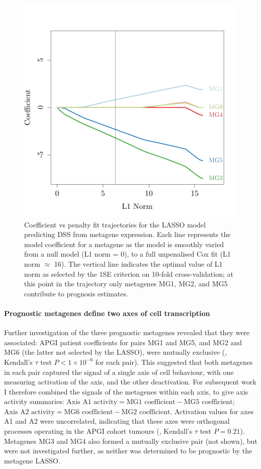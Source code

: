 \documentclass[dissertation.tex]{subfiles}
\begin{document}
\begin{figure}[!htbp]
\centering
\includegraphics[width=.7\linewidth]{analysis/biosurv/reports/18_SIS_diag_dsd_final/figure/nmf-metagene-glmnet-plots-2}
\caption[Fit trajectory of the \texorpdfstring{\acrshort{LASSO}}{LASSO} predicting \texorpdfstring{\acrshort{DSS}}{DSS} from metagene coefficients]{Coefficient vs penalty fit trajectories for the \acrshort{LASSO} model predicting \gls{DSS} from metagene expression.  Each line represents the model coefficient for a metagene as the model is smoothly varied from a null model (L1 norm = 0), to a full unpenalised Cox fit (L1 norm $\approx$ 16).  The vertical line indicates the optimal value of L1 norm as selected by the 1SE criterion on 10-fold cross-validation; at this point in the trajectory only metagenes MG1, MG2, and MG5 contribute to prognosis estimates.}\label{fig:sigs-resub-lasso-track}
\end{figure}

\paragraph{Prognostic metagenes define two axes of cell transcription}
Further investigation of the three prognostic metagenes revealed that they were associated: \gls{APGI} patient coefficients for pairs MG1 and MG5, and MG2 and MG6 (the latter not selected by the \gls{LASSO}), were mutually exclusive (, Kendall's $\tau$ test $P < 1 \times 10^{-6}$ for each pair).  This suggested that both metagenes in each pair captured the signal of a single axis of cell behaviour, with one measuring activation of the axis, and the other deactivation.  For subsequent work I therefore combined the signals of the metagenes within each axis, to give axis activity summaries: $\text{Axis A1 activity} = \text{MG1 coefficient} - \text{MG5 coefficient}$; $\text{Axis A2 activity} = \text{MG6 coefficient} - \text{MG2 coefficient}$.  Activation values for axes A1 and A2 were uncorrelated, indicating that these axes were orthogonal processes operating in the \gls{APGI} cohort tumours (, Kendall's $\tau$ test $P = 0.21$).  Metagenes MG3 and MG4 also formed a mutually exclusive pair (not shown), but were not investigated further, as neither was determined to be prognostic by the metagene \gls{LASSO}.
\end{document}
